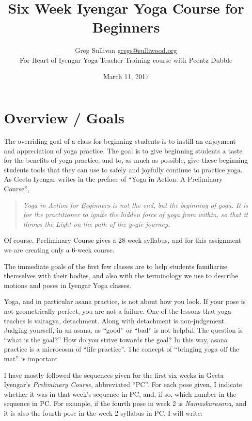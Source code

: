 \documentclass[letter, oneside]{book}
\title{Six Week Iyengar Yoga Course for Beginners}
\author{Greg Sullivan \href{mailto:gregs@sulliwood.org}{gregs@sulliwood.org} \\
For Heart of Iyengar Yoga Teacher Training course with Peentz Dubble
}
\date{March 11, 2017}
\newcommand{\apose}[1]{\emph{#1}}
\newcommand{\nam}{\apose{Namaskarasana}}
\newcounter{week}
\newcounter{pose}
\begin{document}

\maketitle

\tableofcontents

\chapter*{Overview / Goals}
\label{chap:overview}


The overriding goal of a class for beginning students is to instill an
enjoyment and appreciation of yoga practice. The goal is to give
beginning students a taste for the benefits of yoga practice, and to,
as much as possible, give these beginning students tools that they can
use to safely and joyfully continue to practice yoga. As Geeta Iyengar
writes in the preface of ``Yoga in Action: A Preliminary
Course''\cite{GeetaPC}, 

\begin{quote}
  \emph{Yoga in Action for Beginners is not the end, but the beginning of
  yoga. It is for the practitioner to ignite the hidden force of yoga
  from within, so that it throws the Light on the path of the yogic
  journey.}
\end{quote}

Of course, Preliminary Course gives a 28-week syllabus, and for this
assignment we are creating only a 6-week course.

The immediate goals of the first few classes are to help students
familiarize themselves with their bodies, and also with the
terminology we use to describe motions and poses in Iyengar Yoga
classes.

Yoga, and in particular asana practice, is not about how you look. If
your pose is not geometrically perfect, you are not a failure. One of
the lessons that yoga teaches is vairagya, detachment. Along with
detachment is non-judgement. Judging yourself, in an asana, as ``good''
or ``bad'' is not helpful. The question is ``what is the goal?'' How do
you strive towards the goal? In this way, asana practice is a
microcosm of ``life practice''. The concept of ``bringing yoga off the
mat'' is important

I have mostly followed the sequences given for the first six weeks in
Geeta Iyengar's \emph{Preliminary Course}\cite{GeetaPC}, abbreviated
``PC''. For each pose given, I indicate whether it was in that week's
sequence in PC, and, if so, which number in the sequence in PC.
For example, if the fourth pose in week 2 is \nam{}, and it is also
the fourth pose in the week 2 syllabus in PC, I will write:
\end{document}
